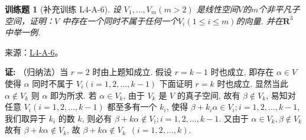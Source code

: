 \documentclass[12pt,fontset=fandol]{ctexart}
\newtheorem{exercise}{训练题}[section]
\begin{document}
\begin{exercise}[补充训练 L4-A-6]\label{prob:L4-A-6}
设 $V_1,\ldots,V_m (m > 2)$ 是线性空间$V$的$m$个非平凡子空间，证明：$V$ 中存在一个同时不属于任何一个$V_i(1 \leqslant i \leqslant m)$的向量. 并在$\mathbf{R}^3$ 中举一例.
\end{exercise}
\noindent 来源：\href{https://github.com/yhwu-is/Linear-Algebra-Left-Undone/blob/new/%E8%AE%B2%E4%B9%89/%E4%B8%93%E9%A2%98/4%20%E7%BA%BF%E6%80%A7%E7%A9%BA%E9%97%B4%E7%9A%84%E8%BF%90%E7%AE%97.tex}{L4-A-6}。
\begin{solve}
\label{eg:4:A:5}
          \textbf{证:} （归纳法）当 $r=2$ 时由上题知成立.
          假设 $r = k-1$ 时也成立, 即存在 $\alpha \in V$
          使得 $\alpha$ 同时不属于 $V_i (i=1,2,\ldots,k-1)$
          下面证明 $r=k$ 时也成立. 显然当此 $\alpha \notin V_k$ 则 $\alpha$ 即为所求.
           若 $\alpha \in V_k$, 由于 $V_k$ 是 $V$ 的真子空间, 故有 $\beta \notin V_k$, 易知对任意 $V_i (i=1,2,\ldots,k-1)$ 都至多有一个 $k_i$, 使得 $\beta + k_i \alpha \in V_i; i=1,2,\ldots,k-1$, 我们取异于 $k_i$ 的数 $k$, 则必有 $\beta + k \alpha \notin V_i; i=1,2,\ldots,k-1$. 又由于 $\alpha \in V_k, \beta \notin V_k$ 故有 $\beta + k \alpha \notin V_k$, 故 $\beta + k \alpha \notin V_k \enspace (i = 1,2,\ldots,k)$.
\end{solve}
\end{document}
